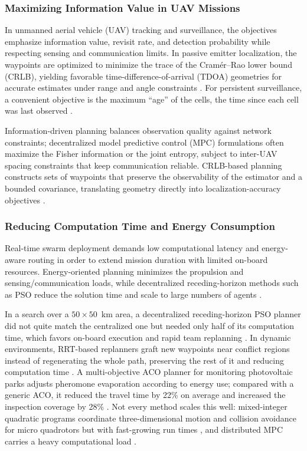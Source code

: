 \subsubsection{Maximizing Information Value in UAV Missions}

In unmanned aerial vehicle (UAV) tracking and surveillance, the objectives
emphasize information value, revisit rate, and detection probability while
respecting sensing and communication limits. In passive emitter localization,
the waypoints are optimized to minimize the trace of the Cram\'er--Rao lower bound
(CRLB), yielding favorable time-difference-of-arrival (TDOA) geometries for
accurate estimates under range and angle constraints \cite{wang2018optimal}.
For persistent surveillance, a convenient objective is the maximum ``age'' of
the cells, the time since each cell was last observed \cite{garcia2018comparison}.

Information-driven planning balances observation quality against network
constraints; decentralized model predictive control (MPC) formulations often
maximize the Fisher information or the joint entropy, subject to inter-UAV
spacing constraints that keep communication reliable. CRLB-based planning
constructs sets of waypoints that preserve the observability of the estimator and
a bounded covariance, translating geometry directly into localization-accuracy
objectives \cite{wang2018optimal,lizzio2022review}.

\subsubsection{Reducing Computation Time and Energy Consumption}

Real-time swarm deployment demands low computational latency and energy-aware
routing in order to extend mission duration with limited on-board resources.
Energy-oriented planning minimizes the propulsion and sensing/communication
loads, while decentralized receding-horizon methods such as PSO reduce the
solution time and scale to large numbers of agents \cite{panigrahi2011handbook,nguyen2024swarm}.

In a search over a $50 \times 50$~km area, a decentralized receding-horizon PSO
planner did not quite match the centralized one but needed only half of its
computation time, which favors on-board execution and rapid team replanning
\cite{garcia2018comparison}. In dynamic environments, RRT-based replanners graft
new waypoints near conflict regions instead of regenerating the whole path,
preserving the rest of it and reducing computation time \cite{li2021rrt}. A
multi-objective ACO planner for monitoring photovoltaic parks adjusts pheromone
evaporation according to energy use; compared with a generic ACO, it reduced the
travel time by 22\% on average and increased the inspection coverage by 28\%
\cite{ziouzios2025energy}. Not every method scales this well: mixed-integer
quadratic programs coordinate three-dimensional motion and collision avoidance
for micro quadrotors but with fast-growing run times \cite{kushleyev2013towards},
and distributed MPC carries a heavy computational load
\cite{lizzio2022review}.
